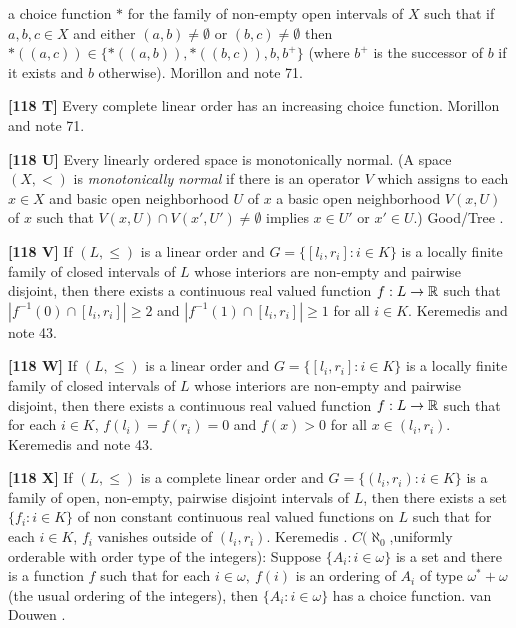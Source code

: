 a choice function $*$ for the family of non-empty open intervals of $X$
such that if $a,b,c\in X$ and either $(a,b)\ne \emptyset$ or
$(b,c)\ne \emptyset$ then $*((a,c)) \in \{ *((a,b)), *((b,c)), b,b^+\}$
(where $b^+$ is the successor of $b$ if it exists and $b$
otherwise).  \ac{Morillon} \cite{1987} and note 71.
\smallskip
\item{}{\bf [118 T]} Every complete linear order has an increasing choice
function.  \ac{Morillon} \cite{1987} and note 71.
\smallskip
\item{}{\bf [118 U]} Every linearly ordered space is monotonically normal.
(A space $(X,<)$ is {\it monotonically normal} if there is an operator
$V$ which assigns to each $x\in X$ and basic open neighborhood $U$ of $x$
a basic open neighborhood $V(x,U)$ of $x$ such that $V(x,U)\cap V(x',U')
\ne\emptyset$ implies $x\in U'$ or $x'\in U$.) \ac{Good/Tree} \cite{1995}.
\smallskip
\item{}{\bf [118 V]} If $(L,\le)$ is a linear order and $G=\{[l_i,r_i]:
i\in K\}$ is a locally finite family of closed intervals of $L$ whose
interiors are non-empty and pairwise disjoint, then there exists a
continuous real valued function $f: L\to \Bbb R$ such that $|f^{-1}(0)
\cap[l_i,r_i]|\ge 2$ and $|f^{-1}(1)\cap[l_i,r_i]|\ge 1$ for all $i\in K$.
\ac{Keremedis} \cite{1997} and note 43.
\smallskip
\item{}{\bf [118 W]} If $(L,\le)$ is a linear order and $G=\{[l_i,r_i]:
i\in K\}$ is a locally finite family of closed intervals of $L$ whose
interiors are non-empty and pairwise disjoint, then there exists a
continuous real valued function $f: L\to \Bbb R$ such that for each
$i\in K$, $f(l_i) = f(r_i) = 0$ and $f(x) > 0$ for all $x\in (l_i, r_i)$.
\ac{Keremedis} \cite{1997} and note 43.
\smallskip
\item{}{\bf [118 X]} If $(L,\le)$ is a complete linear order and $G=
\{(l_i,r_i): i\in K\}$ is a family of open, non-empty, pairwise
disjoint intervals of $L$, then there exists a set $\{f_i: i\in K\}$
of non constant continuous real valued functions on $L$ such that
for each $i\in K$, $f_i$ vanishes outside of $(l_i,r_i)$. \ac{Keremedis}
\cite{1997}.
\medskip
{} $C(\aleph_{0}$,uniformly orderable with order type
of the integers): Suppose $\{ A_{i}: i\in\omega\}$ is a set and there is a
function $f$ such that for each $i\in\omega,\ f(i)$ is an ordering of
$A_{i}$ of type $\omega^{*}+\omega$ (the usual ordering of the integers),
then $\{A_{i}: i\in\omega\}$ has a choice function. van \ac{Douwen}
\cite{1985}.
